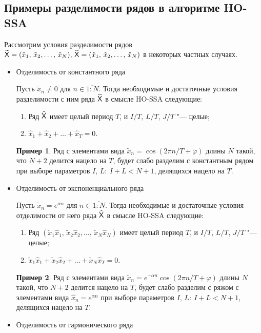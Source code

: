 \documentclass[specialist,
    substylefile = spbu.rtx,
    subf,href,colorlinks=true, 12pt]{disser}
\theoremstyle{plain}
\theoremstyle{definition}
\newtheorem{example}{Пример}[section]
\theoremstyle{remark}
\begin{document}
    \subsection{Примеры разделимости рядов в алгоритме HO-SSA}\label{subsec:separation-example}
    Рассмотрим условия разделимости рядов $\widetilde{\mathsf{X}}=(\tilde{x}_{1},\, \tilde{x}_{2},\ldots,\, \tilde{x}_{N}),\, \widehat{\mathsf{X}}=
    (\hat{x}_{1},\, \hat{x}_{2},\ldots,\, \hat{x}_{N})$ в некоторых частных случаях.
    \begin{itemize}
        \item Отделимость от константного ряда

        Пусть $\tilde{x}_n\ne 0$ для $n\in\overline{1:N}$.
        Тогда необходимые и достаточные условия разделимости с ним ряда $\widehat{\mathsf{X}}$ в смысле HO-SSA следующие:
        \begin{enumerate}
            \item Ряд $\widehat{\mathsf{X}}$ имеет целый период $T$, и $I/T$, $L/T$, $J/T$ "--- целые;
            \item $\hat{x}_{1}+\hat{x}_2+\ldots+\hat{x}_T=0$.
        \end{enumerate}
        \begin{example}
            Ряд с элементами вида $\tilde{x}_n=\cos(2\pi n / T + \varphi)$ длины $N$ такой, что $N+2$ делится нацело на
            $T$, будет слабо разделим с константным рядом при выборе параметров $I,\, L:\: I+L< N+1$,
            делящихся нацело на $T$.
        \end{example}
        \item Отделимость от экспоненциального ряда

        Пусть $\tilde{x}_n=e^{\alpha n}$ для $n\in\overline{1:N}$.
        Тогда необходимые и достаточные условия отделимости от него ряда $\widehat{\mathsf{X}}$ в смысле HO-SSA следующие:
        \begin{enumerate}
            \item Ряд $(\tilde{x}_{1}\hat{x}_{1},\, \tilde{x}_{2}\hat{x}_{2},\ldots,\, \tilde{x}_{N}\hat{x}_{N})$
            имеет целый период $T$, и $I/T$, $L/T$, $J/T$ "--- целые;
            \item $\tilde{x}_{1}\hat{x}_{1}+\tilde{x}_{2}\hat{x}_2+\ldots+\tilde{x}_{N}\hat{x}_T=0$.
        \end{enumerate}
        \begin{example}
            Ряд с элементами вида $\tilde{x}_n=e^{-\alpha n}\cos(2\pi n / T + \varphi)$ длины $N$ такой, что $N+2$ делится нацело на
            $T$, будет слабо разделим с ряжом с элементами вида $\hat{x}_n=e^{\alpha n}$ при выборе параметров $I,\, L:\: I+L< N+1$, делящихся нацело на $T$.
        \end{example}
        \item Отделимость от гармонического ряда


\end{itemize}
\end{document}
